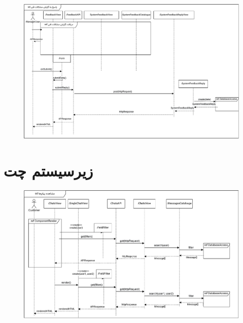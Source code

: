 \begin{figure}[ht!]
	\centering
	\includegraphics[scale=0.8]{figs/design-sequence/3-40.pdf}
\end{figure}

\FloatBarrier
\newpage

\eject \pdfpagewidth=10in \pdfpageheight=9in

\section{زیرسیستم چت}

\begin{figure}[ht!]
	\centering
	\includegraphics[scale=0.8]{figs/design-sequence/3-47.pdf}
\end{figure}
\FloatBarrier
\newpage

